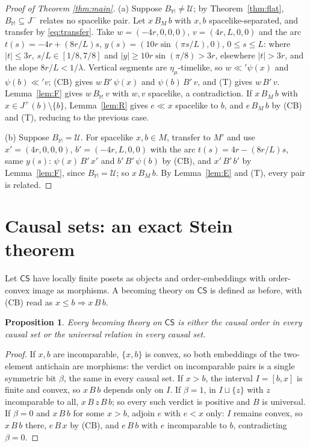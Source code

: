 \documentclass[11pt]{article}
\newtheorem{proposition}[theorem]{Proposition}
\theoremstyle{definition}
\newcommand{\Mink}{\mathbb M}
\newcommand{\U}{\mathcal U}
\newcommand{\Jp}{J^{+}}
\newcommand{\Jm}{J^{-}}
\begin{document}
\begin{proof}[Proof of Theorem \ref{thm:main}]
(a) Suppose $B_\Mink\neq\U$; by Theorem~\ref{thm:flat}, $B_\Mink\subseteq\Jm$
relates no spacelike pair. Let $x\,B_M\,b$ with $x,b$ spacelike-separated, and
transfer by \eqref{eq:transfer}. Take $w=(-4r,0,0,0)$, $v=(4r,L,0,0)$ and the arc
$t(s)=-4r+(8r/L)s$, $y(s)=(10r\sin(\pi s/L),0)$, $0\le s\le L$: where $|t|\le3r$,
$s/L\in[1/8,7/8]$ and $|y|\ge10r\sin(\pi/8)>3r$, elsewhere $|t|>3r$, and the
slope $8r/L<1/\lambda$. Vertical segments are $\eta_\mu$-timelike, so
$w\ll'\psi(x)$ and $\psi(b)\ll'v$; (CB) gives $w\,B'\,\psi(x)$ and
$\psi(b)\,B'\,v$, and (T) gives $w\,B'\,v$. Lemma~\ref{lem:F} gives $w\,B_\Mink\,v$
with $w,v$ spacelike, a contradiction. If $x\,B_M\,b$ with
$x\in\Jp(b)\setminus\{b\}$, Lemma~\ref{lem:R} gives $e\ll x$ spacelike to $b$, and
$e\,B_M\,b$ by (CB) and (T), reducing to the previous case.

(b) Suppose $B_\Mink=\U$. For spacelike $x,b\in M$, transfer to $M'$ and use
$x'=(4r,0,0,0)$, $b'=(-4r,L,0,0)$ with the arc $t(s)=4r-(8r/L)s$, same $y(s)$:
$\psi(x)\,B'\,x'$ and $b'\,B'\,\psi(b)$ by (CB), and $x'\,B'\,b'$ by
Lemma~\ref{lem:F}, since $B_\Mink=\U$; so $x\,B_M\,b$. By Lemma~\ref{lem:E} and
(T), every pair is related.
\end{proof}

\section{Causal sets: an exact Stein theorem}\label{sec:causets}

Let $\mathsf{CS}$ have locally finite posets as objects and order-embeddings
with order-convex image as morphisms. A becoming theory on $\mathsf{CS}$ is
defined as before, with (CB) read as $x\le b\Rightarrow x\,B\,b$.

\begin{proposition}\label{prop:causets}
Every becoming theory on $\mathsf{CS}$ is either the causal order in every
causal set or the universal relation in every causal set.
\end{proposition}

\begin{proof}
If $x,b$ are incomparable, $\{x,b\}$ is convex, so both embeddings of the
two-element antichain are morphisms: the verdict on incomparable pairs is a
single symmetric bit $\beta$, the same in every causal set. If $x>b$, the
interval $I=[b,x]$ is finite and convex, so $x\,B\,b$ depends only on $I$. If
$\beta=1$, in $I\sqcup\{z\}$ with $z$ incomparable to all, $x\,B\,z\,B\,b$; so
every such verdict is positive and $B$ is universal. If $\beta=0$ and
$x\,B\,b$ for some $x>b$, adjoin $e$ with $e<x$ only: $I$ remains convex, so
$x\,B\,b$ there, $e\,B\,x$ by (CB), and $e\,B\,b$ with $e$ incomparable to $b$,
contradicting $\beta=0$.
\end{proof}
\end{document}
